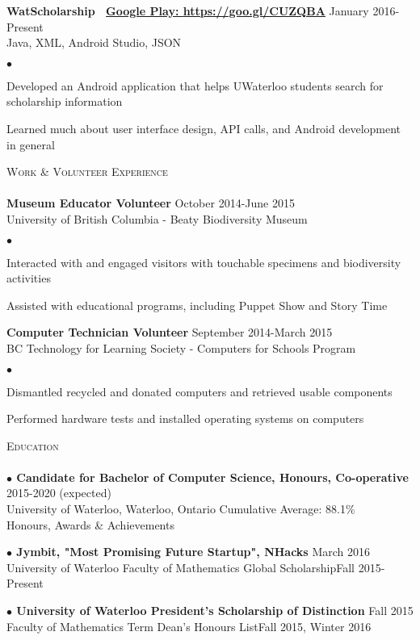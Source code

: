 \documentclass{article}
\newcommand{\lineunder}{\vspace*{-8pt} \\ \hspace*{-18pt} \hrulefill \\}
\newcommand{\header}[1]{{\hspace*{-15pt}\vspace*{6pt} \textsc{#1}} \vspace*{-6pt} \lineunder}
\newcommand{\employer}[3]{{ \textbf{#1} \hfill #2\\ {#3}\\  }}
\newenvironment{achievements}{\begin{list}{$\bullet$}{\topsep 0pt \itemsep -2pt}}{\vspace*{4pt}\end{list}}
\newcommand{\schoolwithcourses}[4]{
 \textbf{$\bullet$ \hspace{2bp}#1} \hfill{#2}\\ \hspace{6mm}#3\\ 
\vspace*{5pt}
}
\newcommand{\award}[3]{\textbf{$\bullet$ \hspace{2bp}#1} \hfill{#2} \\ \vspace{2pt}
}
\begin{document}
\employer{WatScholarship \hspace{5pt} \Mundus~\href{https://goo.gl/CUZQBA}{Google Play: \underline{https://goo.gl/CUZQBA}}}{January 2016-Present}{Java, XML, Android Studio, JSON}
	\begin{achievements}
	\item Developed an Android application that helps UWaterloo students search for scholarship information
	\item Learned much about user interface design, API calls, and Android development in general
	\end{achievements}

\header{Work \& Volunteer Experience}
\employer{Museum Educator Volunteer}{October 2014-June 2015}{University of British Columbia - Beaty Biodiversity Museum}
	\begin{achievements}
	\item Interacted with and engaged visitors with touchable specimens and biodiversity activities
	\item Assisted with educational programs, including Puppet Show and Story Time 
	\end{achievements}

\employer{Computer Technician Volunteer}{September 2014-March 2015}{BC Technology for Learning Society - Computers for Schools Program}
	\begin{achievements}
	\item Dismantled recycled and donated computers and retrieved usable components
	\item Performed hardware tests and installed operating systems on computers
	\end{achievements}

\header{Education}

\schoolwithcourses{Candidate for Bachelor of Computer Science, Honours, Co-operative}{2015-2020 (expected)}{University of Waterloo, Waterloo, Ontario \hspace{27pt} Cumulative Average: 88.1\%}


\header{Honours, Awards \& Achievements}

\award {Jymbit, "Most Promising Future Startup", NHacks}{March 2016}

\award {University of Waterloo Faculty of Mathematics Global Scholarship}{Fall 2015-Present}

\award{University of Waterloo President's Scholarship of Distinction}{Fall 2015}

\award{Faculty of Mathematics Term Dean's Honours List}{Fall 2015, Winter 2016}
\end{document}
